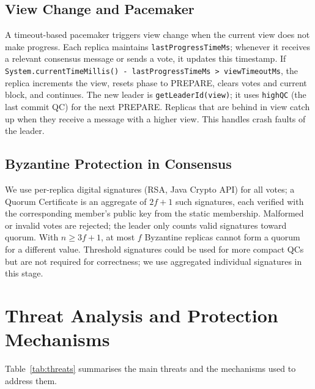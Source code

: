 \documentclass{llncs}
\begin{document}
\subsection{View Change and Pacemaker}

A timeout-based pacemaker triggers view change when the current view does not make progress. Each replica maintains \texttt{lastProgressTimeMs}; whenever it receives a relevant consensus message or sends a vote, it updates this timestamp. If \texttt{System.currentTimeMillis() - lastProgressTimeMs > viewTimeoutMs}, the replica increments the view, resets phase to PREPARE, clears votes and current block, and continues. The new leader is \texttt{getLeaderId(view)}; it uses \texttt{highQC} (the last commit QC) for the next PREPARE. Replicas that are behind in view catch up when they receive a message with a higher view. This handles crash faults of the leader.

\subsection{Byzantine Protection in Consensus}

We use per-replica digital signatures (RSA, Java Crypto API) for all votes; a Quorum Certificate is an aggregate of $2f+1$ such signatures, each verified with the corresponding member's public key from the static membership. Malformed or invalid votes are rejected; the leader only counts valid signatures toward quorum. With $n \ge 3f+1$, at most $f$ Byzantine replicas cannot form a quorum for a different value. Threshold signatures could be used for more compact QCs~\cite{weavechain} but are not required for correctness; we use aggregated individual signatures in this stage.

\section{Threat Analysis and Protection Mechanisms}
\vspace{-0.5em}
Table~\ref{tab:threats} summarises the main threats and the mechanisms used to address them.
\end{document}
